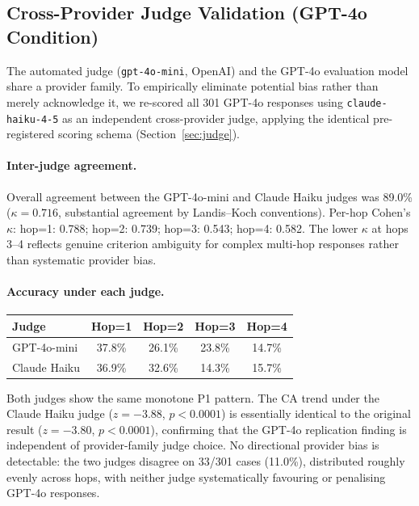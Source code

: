\documentclass{article}
\begin{document}
\subsection{Cross-Provider Judge Validation (GPT-4o Condition)}
\label{app:cross_provider_judge}

The automated judge (\texttt{gpt-4o-mini}, OpenAI) and the GPT-4o evaluation model share a provider family. To empirically eliminate potential bias rather than merely acknowledge it, we re-scored all 301 GPT-4o responses using \texttt{claude-haiku-4-5} as an independent cross-provider judge, applying the identical pre-registered scoring schema (Section~\ref{sec:judge}).

\paragraph{Inter-judge agreement.}
Overall agreement between the GPT-4o-mini and Claude Haiku judges was 89.0\% ($\kappa = 0.716$, substantial agreement by Landis--Koch conventions). Per-hop Cohen's $\kappa$: hop=1: 0.788; hop=2: 0.739; hop=3: 0.543; hop=4: 0.582. The lower $\kappa$ at hops 3--4 reflects genuine criterion ambiguity for complex multi-hop responses rather than systematic provider bias.

\paragraph{Accuracy under each judge.}
\begin{center}
\small
\begin{tabular}{lcccc}
\toprule
\textbf{Judge} & \textbf{Hop=1} & \textbf{Hop=2} & \textbf{Hop=3} & \textbf{Hop=4} \\
\midrule
GPT-4o-mini & 37.8\% & 26.1\% & 23.8\% & 14.7\% \\
Claude Haiku & 36.9\% & 32.6\% & 14.3\% & 15.7\% \\
\bottomrule
\end{tabular}
\end{center}

Both judges show the same monotone P1 pattern. The CA trend under the Claude Haiku judge ($z = -3.88$, $p < 0.0001$) is essentially identical to the original result ($z = -3.80$, $p < 0.0001$), confirming that the GPT-4o replication finding is independent of provider-family judge choice. No directional provider bias is detectable: the two judges disagree on 33/301 cases (11.0\%), distributed roughly evenly across hops, with neither judge systematically favouring or penalising GPT-4o responses.
\end{document}
